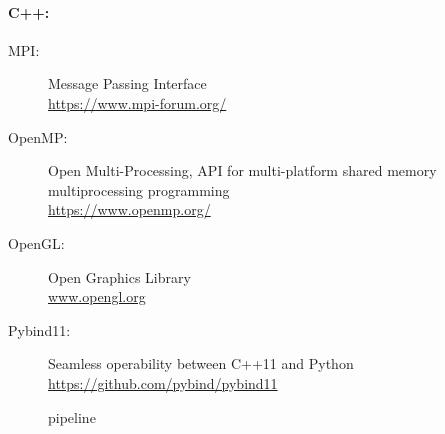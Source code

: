 \paragraph{C++:}
\begin{description}
\item[MPI:] Message Passing Interface \cite{message2015mpi}\\
\url{https://www.mpi-forum.org/}
\item[OpenMP:] Open Multi-Processing, API for multi-platform shared memory multiprocessing programming \cite{dagum1998openmp}\\
\url{https://www.openmp.org/}
\item[OpenGL:] Open Graphics Library \cite{khronos}\\
\url{www.opengl.org}
\item[Pybind11:] Seamless operability between C++11 and Python \cite{pybind11}\\ \url{https://github.com/pybind/pybind11} 
\end{description}
% 
% 
\begin{figure}[!t]
\centering
{}
\caption{pipeline}
\label{fig:sim_pipeline}
\end{figure}
% 
\begin{figure}[!t]
    \centering
	\caption{\dummy{}}
	\label{fig:fastpli_wiki_home}
\end{figure}
